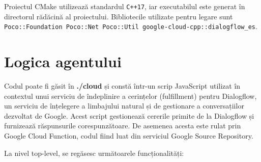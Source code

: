 Proiectul CMake utilizează standardul \texttt{C++17}, iar executabilul este generat în directorul rădăcină al proiectului. Bibliotecile utilizate pentru legare sunt \texttt{Poco::Foundation Poco::Net Poco::Util google-cloud-cpp::dialogflow\_es}.

\section{Logica agentului}

Codul poate fi găsit în \textbf{./cloud} și constă într-un scrip JavaScript utilizat în contextul unui serviciu de îndeplinire a cerințelor (fulfillment) pentru Dialogflow, un serviciu de înțelegere a limbajului natural și de gestionare a conversațiilor dezvoltat de Google. Acest script gestionează cererile primite de la Dialogflow și furnizează răspunsurile corespunzătoare. De asemenea acesta este rulat prin Google Cloud Function, codul fiind luat din serviciul Google Source Repository.

La nivel top-level, se regăsesc următoarele funcționalități:

